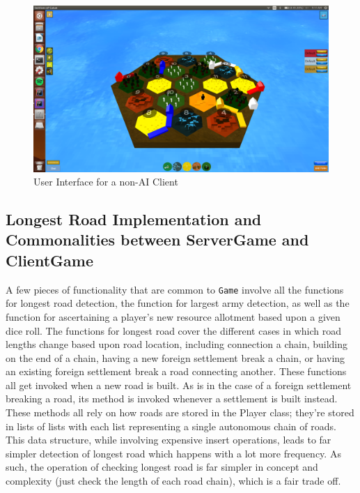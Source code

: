 \documentclass[a4paper,doc]{apa6}
\newcommand{\code}{\texttt}
\begin{document}
\begin{figure}[hbtp]
      \includegraphics[width=\textwidth]{userInterface}
      \caption{User Interface for a non-AI Client}
\end{figure}

\subsection{Longest Road Implementation and Commonalities between ServerGame and ClientGame}
A few pieces of functionality that are common to \code{Game} involve all the functions for longest road detection, the function for largest army detection, as well as the function for ascertaining a player’s new resource allotment based upon a given dice roll. The functions for longest road cover the different cases in which road lengths change based upon road location, including connection a chain, building on the end of a chain, having a new foreign settlement break a chain, or having an existing foreign settlement break a road connecting another. These functions all get invoked when a new road is built. As is in the case of a foreign settlement breaking a road, its method is invoked whenever a settlement is built instead. These methods all rely on how roads are stored in the Player class; they’re stored in lists of lists with each list representing a single autonomous chain of roads. This data structure, while involving expensive insert operations, leads to far simpler detection of longest road which happens with a lot more frequency. As such, the operation of checking longest road is far simpler in concept and complexity (just check the length of each road chain), which is a fair trade off.
\end{document}
